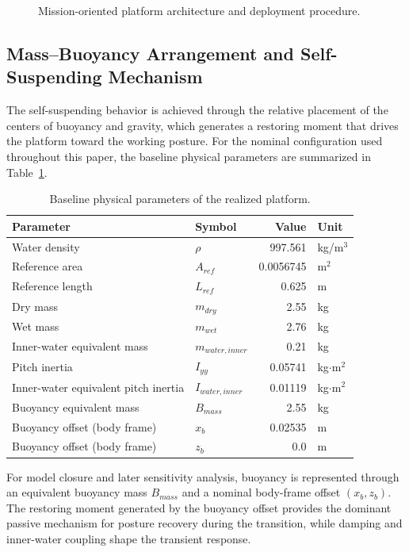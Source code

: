 \begin{figure}[htbp]
  \centering
  \caption{Mission-oriented platform architecture and deployment procedure.}
  \label{fig:mission-architecture}
\end{figure}

\subsection{Mass--Buoyancy Arrangement and Self-Suspending Mechanism}

The self-suspending behavior is achieved through the relative placement of the centers of buoyancy and gravity, which generates a restoring moment that drives the platform toward the working posture. For the nominal configuration used throughout this paper, the baseline physical parameters are summarized in Table~\ref{tab:baseline-params}.

\begin{table}[htbp]
  \centering
  \caption{Baseline physical parameters of the realized platform.}
  \label{tab:baseline-params}
  \begin{tabular}{llrl}
    \toprule
    Parameter & Symbol & Value & Unit \\
    \midrule
    Water density & $\rho$ & 997.561 & kg/m$^3$ \\
    Reference area & $A_{ref}$ & 0.0056745 & m$^2$ \\
    Reference length & $L_{ref}$ & 0.625 & m \\
    Dry mass & $m_{dry}$ & 2.55 & kg \\
    Wet mass & $m_{wet}$ & 2.76 & kg \\
    Inner-water equivalent mass & $m_{water,inner}$ & 0.21 & kg \\
    Pitch inertia & $I_{yy}$ & 0.05741 & kg$\cdot$m$^2$ \\
    Inner-water equivalent pitch inertia & $I_{water,inner}$ & 0.01119 & kg$\cdot$m$^2$ \\
    Buoyancy equivalent mass & $B_{mass}$ & 2.55 & kg \\
    Buoyancy offset (body frame) & $x_b$ & 0.02535 & m \\
    Buoyancy offset (body frame) & $z_b$ & 0.0 & m \\
    \bottomrule
  \end{tabular}
\end{table}

For model closure and later sensitivity analysis, buoyancy is represented through an equivalent buoyancy mass $B_{mass}$ and a nominal body-frame offset $(x_b, z_b)$. The restoring moment generated by the buoyancy offset provides the dominant passive mechanism for posture recovery during the transition, while damping and inner-water coupling shape the transient response.

